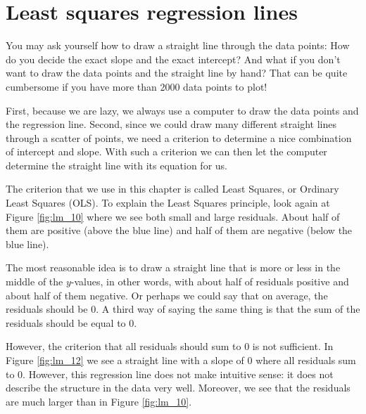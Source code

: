 \documentclass[]{book}\usepackage[]{graphicx}\usepackage[]{color}
\begin{document}
\section{Least squares regression lines}


You may ask yourself how to draw a straight line through the data points: How do you decide the exact slope and the exact intercept? And what if you don't want to draw the data points and the straight line by hand? That can be quite cumbersome if you have more than 2000 data points to plot!

First, because we are lazy, we always use a computer to draw the data points and the regression line. Second, since we could draw many different straight lines through a scatter of points, we need a criterion to determine a nice combination of intercept and slope. With such a criterion we can then let the computer determine the straight line with its equation for us.

The criterion that we use in this chapter is called Least Squares, or Ordinary Least Squares (OLS). To explain the Least Squares principle, look again at Figure \ref{fig:lm_10} where we see both small and large residuals. About half of them are positive (above the blue line) and half of them are negative (below the blue line).

The most reasonable idea is to draw a straight line that is more or less in the middle of the $y$-values, in other words, with about half of residuals positive and about half of them negative. Or perhaps we could say that on average, the residuals should be 0. A third way of saying the same thing is that the sum of the residuals should be equal to 0.

However, the criterion that all residuals should sum to 0 is not sufficient. In Figure \ref{fig:lm_12} we see a straight line with a slope of 0 where all residuals sum to 0. However, this regression line does not make intuitive sense: it does not describe the structure in the data very well. Moreover, we see that the residuals are much larger than in Figure \ref{fig:lm_10}.
\end{document}
